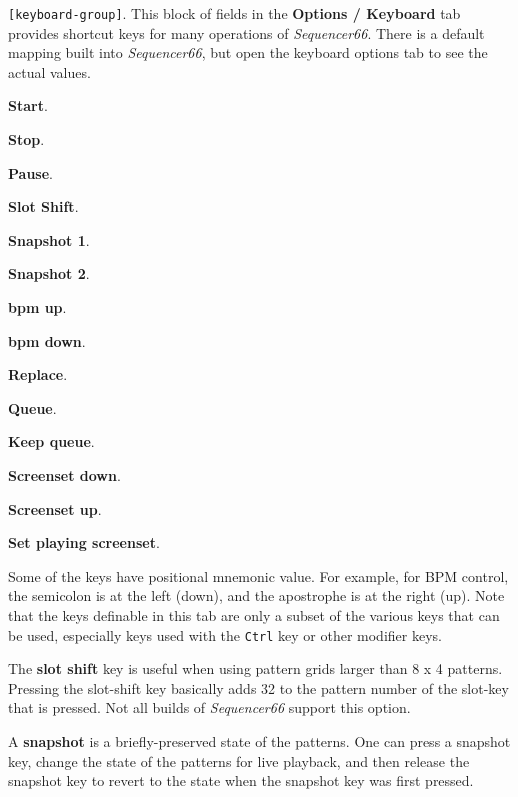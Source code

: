    \texttt{[keyboard-group]}.
   This block of fields in the \textbf{Options / Keyboard} tab
   provides shortcut keys for many operations of
   \textsl{Sequencer66}.  There is a default mapping built into
   \textsl{Sequencer66}, but open the keyboard options tab to see
   the actual values.
   

   \begin{enumber}
      \item \textbf{Start}.
      \item \textbf{Stop}.
      \item \textbf{Pause}.
      \item \textbf{Slot Shift}.
      \item \textbf{Snapshot 1}.
      \item \textbf{Snapshot 2}.
      \item \textbf{bpm up}.
      \item \textbf{bpm down}.
      \item \textbf{Replace}.
      \item \textbf{Queue}.
      \item \textbf{Keep queue}.
      \item \textbf{Screenset down}.
      \item \textbf{Screenset up}.
      \item \textbf{Set playing screenset}.
   \end{enumber}

   Some of the keys have positional mnemonic value.  For example,
   for BPM control, the semicolon is at the left (down), and the apostrophe
   is at the right (up).
   Note that the keys definable in this tab are only a subset of the
   various keys that can be used, especially keys used with the
   \texttt{Ctrl} key or other modifier keys.

   The \textbf{slot shift} key is useful when using pattern grids larger
   than 8 x 4 patterns.  Pressing the slot-shift key basically adds 32 to the
   pattern number of the slot-key that is pressed.
   Not all builds of \textsl{Sequencer66} support this option.

   A \textbf{snapshot} is a briefly-preserved state of the patterns.
   One can press a snapshot key, change the state of the patterns for live
   playback, and then release the snapshot key to revert to the state when
   the snapshot key was first pressed.

